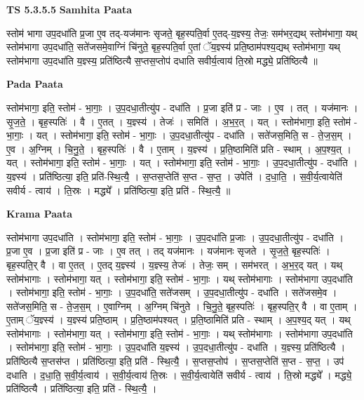 \documentclass[17pt]{extarticle}
\begin{document}
\textbf{TS 5.3.5.5 } \newline
\textbf{Samhita Paata} \newline

स्तोम॑ भागा उप॒दधा॑ति प्र॒जा ए॒व तद्-यज॑मानः सृजते॒ बृह॒स्पति॒र्वा ए॒तद्-य॒ज्ञ्स्य॒ तेजः॒ सम॑भर॒द्यथ् स्तोम॑भागा॒ यथ् स्तोम॑भागा उप॒दधा॑ति॒ सते॑जसमे॒वाग्निं चि॑नुते॒ बृह॒स्पति॒र्वा ए॒तां ॅय॒ज्ञ्स्य॑ प्रति॒ष्ठाम॑पश्य॒द्यथ् स्तोम॑भागा॒ यथ् स्तोम॑भागा उप॒दधा॑ति य॒ज्ञ्स्य॒ प्रति॑ष्ठित्यै स॒प्तस॒प्तोप॑ दधाति सवीर्य॒त्वाय॑ ति॒स्रो मद्ध्ये॒ प्रति॑ष्ठित्यै ॥ \newline

\textbf{Pada Paata} \newline

स्तोम॑भागा॒ इति॒ स्तोम॑ - भा॒गाः॒ । उ॒प॒दधा॒तीत्यु॑प - दधा॑ति । प्र॒जा इति॑ प्र - जाः । ए॒व । तत् । यज॑मानः । सृ॒ज॒ते॒ । बृह॒स्पतिः॑ । वै । ए॒तत् । य॒ज्ञ्स्य॑ । तेजः॑ । समिति॑ । अ॒भ॒र॒त् । यत् । स्तोम॑भागा॒ इति॒ स्तोम॑ - भा॒गाः॒ । यत् । स्तोम॑भागा॒ इति॒ स्तोम॑ - भा॒गाः॒ । उ॒प॒दधा॒तीत्यु॑प - दधा॑ति । सते॑जस॒मिति॒ स - ते॒ज॒स॒म् । ए॒व । अ॒ग्निम् । चि॒नु॒ते॒ । बृह॒स्पतिः॑ । वै । ए॒ताम् । य॒ज्ञ्स्य॑ । प्र॒ति॒ष्ठामिति॑ प्रति - स्थाम् । अ॒प॒श्य॒त् । यत् । स्तोम॑भागा॒ इति॒ स्तोम॑ - भा॒गाः॒ । यत् । स्तोम॑भागा॒ इति॒ स्तोम॑ - भा॒गाः॒ । उ॒प॒दधा॒तीत्यु॑प - दधा॑ति । य॒ज्ञ्स्य॑ । प्रति॑ष्ठित्या॒ इति॒ प्रति॑-स्थि॒त्यै॒ । स॒प्तस॒प्तेति॑ स॒प्त - स॒प्त॒ । उपेति॑ । द॒धा॒ति॒ । स॒वी॒र्य॒त्वायेति॑ सवीर्य - त्वाय॑ । ति॒स्रः । मद्ध्ये᳚ । प्रति॑ष्ठित्या॒ इति॒ प्रति॑ - स्थि॒त्यै॒ ॥  \newline


\textbf{Krama Paata} \newline

स्तोम॑भागा उप॒दधा॑ति । स्तोम॑भागा॒ इति॒ स्तोम॑ - भा॒गाः॒ । उ॒प॒दधा॑ति प्र॒जाः । उ॒प॒दधा॒तीत्यु॑प - दधा॑ति । प्र॒जा ए॒व । प्र॒जा इति॑ प्र - जाः । ए॒व तत् । तद् यज॑मानः । यज॑मानः सृजते । सृ॒ज॒ते॒ बृह॒स्पतिः॑ । बृह॒स्पति॒र् वै । वा ए॒तत् । ए॒तद् य॒ज्ञ्स्य॑ । य॒ज्ञ्स्य॒ तेजः॑ । तेजः॒ सम् । सम॑भरत् । अ॒भ॒र॒द् यत् । यथ् स्तोम॑भागाः । स्तोम॑भागा॒ यत् । स्तोम॑भागा॒ इति॒ स्तोम॑ - भा॒गाः॒ । यथ् स्तोम॑भागाः । स्तोम॑भागा उप॒दधा॑ति । स्तोम॑भागा॒ इति॒ स्तोम॑ - भा॒गाः॒ । उ॒प॒दधा॑ति॒ सते॑जसम् । उ॒प॒दधा॒तीत्यु॑प - दधा॑ति । सते॑जसमे॒व । सते॑जस॒मिति॒ स - ते॒ज॒स॒म् । ए॒वाग्निम् । अ॒ग्निम् चि॑नुते । चि॒नु॒ते॒ बृह॒स्पतिः॑ । बृह॒स्पति॒र् वै । वा ए॒ताम् । ए॒ताम् ॅय॒ज्ञ्स्य॑ । य॒ज्ञ्स्य॑ प्रति॒ष्ठाम् । प्र॒ति॒ष्ठाम॑पश्यत् । प्र॒ति॒ष्ठामिति॑ प्रति - स्थाम् । अ॒प॒श्य॒द् यत् । यथ् स्तोम॑भागाः । स्तोम॑भागा॒ यत् । स्तोम॑भागा॒ इति॒ स्तोम॑ - भा॒गाः॒ । यथ् स्तोम॑भागाः । स्तोम॑भागा उप॒दधा॑ति । स्तोम॑भागा॒ इति॒ स्तोम॑ - भा॒गाः॒ । उ॒प॒दधा॑ति य॒ज्ञ्स्य॑ । उ॒प॒दधा॒तीत्यु॑प - दधा॑ति । य॒ज्ञ्स्य॒ प्रति॑ष्ठित्यै । प्रति॑ष्ठित्यै स॒प्तस॑प्त । प्रति॑ष्ठित्या॒ इति॒ प्रति॑ - स्थि॒त्यै॒ । स॒प्तस॒प्तोप॑ । स॒प्तस॒प्तेति॑ स॒प्त - स॒प्त॒ । उप॑ दधाति । द॒धा॒ति॒ स॒वी॒र्य॒त्वाय॑ । स॒वी॒र्य॒त्वाय॑ ति॒स्रः । स॒वी॒र्य॒त्वायेति॑ सवीर्य - त्वाय॑ । ति॒स्रो मद्ध्ये᳚ । मद्ध्ये॒ प्रति॑ष्ठित्यै । प्रति॑ष्ठित्या॒ इति॒ प्रति॑ - स्थि॒त्यै॒ । \newline
\end{document}
